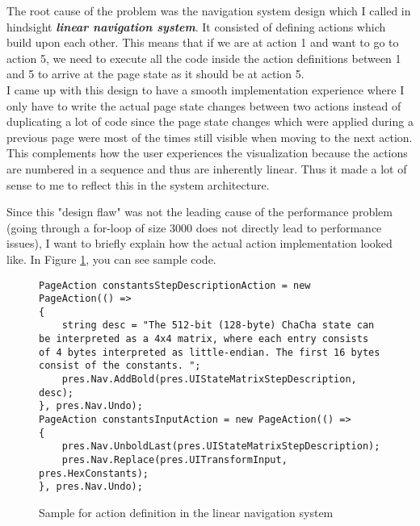 The root cause of the problem was the navigation system design which I called in hindsight \textbf{\textit{linear navigation system}}. It consisted of defining actions which build upon each other. This means that if we are at action 1 and want to go to action 5, we need to execute all the code inside the action definitions between 1 and 5 to arrive at the page state as it should be at action 5. \\
I came up with this design to have a smooth implementation experience where I only have to write the actual page state changes between two actions instead of duplicating a lot of code since the page state changes which were applied during a previous page were most of the times still visible when moving to the next action. This complements how the user experiences the visualization because the actions are numbered in a sequence and thus are inherently linear. Thus it made a lot of sense to me to reflect this in the system architecture.

\par

Since this "design flaw" was not the leading cause of the performance problem (going through a for-loop of size 3000 does not directly lead to performance issues), I want to briefly explain how the actual action implementation looked like. In Figure \ref{code.linear}, you can see sample code.

\begin{figure}
\caption{Sample for action definition in the linear navigation system}
\label{code.linear}
\begin{verbatim}
PageAction constantsStepDescriptionAction = new PageAction(() =>
{
	string desc = "The 512-bit (128-byte) ChaCha state can be interpreted as a 4x4 matrix, where each entry consists of 4 bytes interpreted as little-endian. The first 16 bytes consist of the constants. ";
	pres.Nav.AddBold(pres.UIStateMatrixStepDescription, desc);
}, pres.Nav.Undo);
PageAction constantsInputAction = new PageAction(() =>
{
	pres.Nav.UnboldLast(pres.UIStateMatrixStepDescription);
	pres.Nav.Replace(pres.UITransformInput, pres.HexConstants);
}, pres.Nav.Undo);
\end{verbatim}
\end{figure}